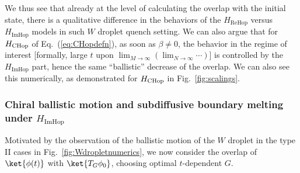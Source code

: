 \documentclass[prx,letterpaper,aps,superscriptaddress,floatfix,twocolumn,nofootinbib]{revtex4-2}
\theoremstyle{definition}
\begin{document}
%
We thus see that already at the level of calculating the overlap with the initial state, there is a qualitative difference in the behaviors of the $H_{\text{ReHop}}$ versus $H_{\text{ImHop}}$ models in such $W$ droplet quench setting.
%
We can also argue that for $H_{\rm CHop}$ of Eq.~(\ref{eq:CHopdefn}), as soon as $\beta \neq 0$, the behavior in the regime of interest [formally, large $t$ upon $\lim_{M\to \infty} (\lim_{N \to \infty} \cdots)$] is controlled by the $H_{\text{ImHop}}$ part, hence the same ``ballistic'' decrease of the overlap.
%
We can also see this numerically, as demonstrated for $H_{\rm CHop}$ in Fig.~\ref{fig:scalings}.
%

%
\subsubsection{Chiral ballistic motion and subdiffusive boundary melting under $H_{\text{ImHop}}$}
%
Motivated by the observation of the ballistic motion of the $W$ droplet in the type II cases in Fig.~\ref{fig:Wdropletnumerics}, we now consider the overlap of $\ket{\phi(t)}$ with $\ket{T_G\phi_0}$, choosing optimal $t$-dependent $G$.
%
\end{document}
